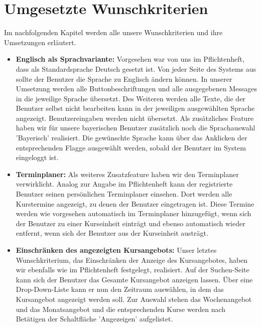 \chapter{Umgesetzte Wunschkriterien}
Im nachfolgenden Kapitel werden alle unsere Wunschkriterien und ihre Umsetzungen erläutert. \ \\

\begin{itemize}
	\item \textbf{Englisch als Sprachvariante:} Vorgesehen war von uns im Pflichtenheft, dass als Standardsprache Deutsch gesetzt ist. Von jeder Seite des Systems aus sollte der Benutzer die Sprache zu Englisch ändern können. In unserer Umsetzung werden alle Buttonbeschriftungen und alle ausgegebenen Messages in die jeweilige Sprache übersetzt. Des Weiteren werden alle Texte, die der Benutzer selbst nicht bearbeiten kann in der jeweiligen ausgewählten Sprache angezeigt. Benutzereingaben werden nicht übersetzt. Als zusätzliches Feature haben wir für unsere bayerischen Benutzer zusätzlich noch die Sprachauswahl 'Bayerisch' realisiert. Die gewünschte Sprache kann über das Anklicken der entsprechenden Flagge ausgewählt werden, sobald der Benutzer im System eingeloggt ist.
	\item \textbf{Terminplaner:} Als weiteres Zusatzfeature haben wir den Terminplaner verwirklicht. Analog zur Angabe im Pflichtenheft kann der registrierte Benutzer seinen persönlichen Terminplaner einsehen. Dort werden alle Kurstermine angezeigt, zu denen der Benutzer eingetragen ist. Diese Termine werden wie vorgesehen automatisch im Terminplaner hinzugefügt, wenn sich der Benutzer zu einer Kurseinheit einträgt und ebenso automatisch wieder entfernt, wenn sich der Benutzer aus der Kurseinheit austrägt.
	\item \textbf{Einschränken des angezeigten Kursangebots:} Unser letztes Wunschkriterium, das Einschränken der Anzeige des Kursangebotes, haben wir ebenfalls wie im Pflichtenheft festgelegt, realisiert. Auf der Suchen-Seite kann sich der Benutzer das Gesamte Kursangebot anzeigen lassen. Über eine Drop-Down-Liste kann er nun den Zeitraum auswählen, in dem das Kursangebot angezeigt werden soll. Zur Auswahl stehen das Wochenangebot und das Monatsangebot und die entsprechenden Kurse werden nach Betätigen der Schaltfläche 'Angezeigen' aufgelistet.
\end{itemize} 